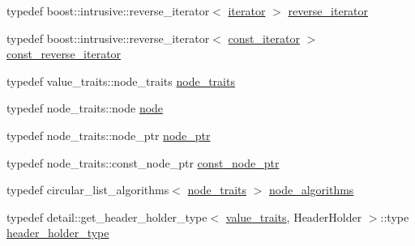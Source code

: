 \begin{DoxyCompactItemize}
\item 
typedef boost\+::intrusive\+::reverse\+\_\+iterator$<$ \hyperlink{classboost_1_1intrusive_1_1list__impl_a15c0189bf62eb9fb98bc07ef10b8cb23}{iterator} $>$ \hyperlink{classboost_1_1intrusive_1_1list__impl_aed95b235a2056faa7d2f8cbd58dcfeb7}{reverse\+\_\+iterator}
\item 
typedef boost\+::intrusive\+::reverse\+\_\+iterator$<$ \hyperlink{classboost_1_1intrusive_1_1list__impl_af4ced710fe02662c5650d161af83d8cd}{const\+\_\+iterator} $>$ \hyperlink{classboost_1_1intrusive_1_1list__impl_a00a0933ca1d92836a220a604e521d9c4}{const\+\_\+reverse\+\_\+iterator}
\item 
typedef value\+\_\+traits\+::node\+\_\+traits \hyperlink{classboost_1_1intrusive_1_1list__impl_ae96503e0398292d5763e84a6baf677ba}{node\+\_\+traits}
\item 
typedef node\+\_\+traits\+::node \hyperlink{classboost_1_1intrusive_1_1list__impl_aaaa96a7e3013b33e4da86a3725352844}{node}
\item 
typedef node\+\_\+traits\+::node\+\_\+ptr \hyperlink{classboost_1_1intrusive_1_1list__impl_a1b1b1d87a4edc6bfee4e43622184e689}{node\+\_\+ptr}
\item 
typedef node\+\_\+traits\+::const\+\_\+node\+\_\+ptr \hyperlink{classboost_1_1intrusive_1_1list__impl_a1bdb914613818a3acb6866cdba10ff09}{const\+\_\+node\+\_\+ptr}
\item 
typedef circular\+\_\+list\+\_\+algorithms$<$ \hyperlink{classboost_1_1intrusive_1_1list__impl_ae96503e0398292d5763e84a6baf677ba}{node\+\_\+traits} $>$ \hyperlink{classboost_1_1intrusive_1_1list__impl_ad71774881b8a43de5d41e39af79afcaf}{node\+\_\+algorithms}
\item 
typedef detail\+::get\+\_\+header\+\_\+holder\+\_\+type$<$ \hyperlink{classboost_1_1intrusive_1_1list__impl_a5cd55672f6df367749d91ef708834126}{value\+\_\+traits}, Header\+Holder $>$\+::type \hyperlink{classboost_1_1intrusive_1_1list__impl_abd98fa5c33715ec93ec42f3b5755b87b}{header\+\_\+holder\+\_\+type}
\end{DoxyCompactItemize}
